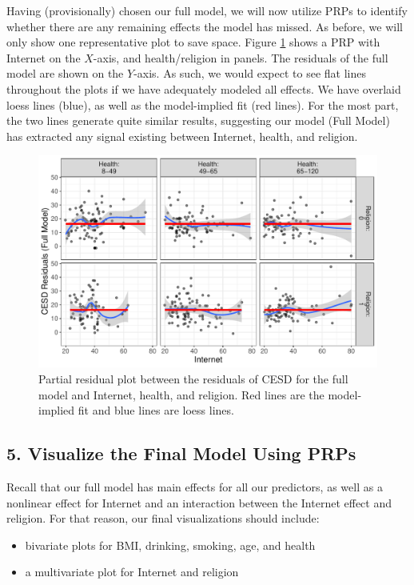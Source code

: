 \documentclass[
  man,floatsintext]{apa6}
\providecommand{\tightlist}{%
  \setlength{\itemsep}{0pt}\setlength{\parskip}{0pt}}
\begin{document}
Having (provisionally) chosen our full model, we will now utilize PRPs to identify whether there are any remaining effects the model has missed. As before, we will only show one representative plot to save space. Figure \ref{fig:prpexample} shows a PRP with Internet on the \(X\)-axis, and health/religion in panels. The residuals of the full model are shown on the \(Y\)-axis. As such, we would expect to see flat lines throughout the plots if we have adequately modeled all effects. We have overlaid loess lines (blue), as well as the model-implied fit (red lines). For the most part, the two lines generate quite similar results, suggesting our model (Full Model) has extracted any signal existing between Internet, health, and religion.

\begin{figure}

{\centering \includegraphics[width=0.75\linewidth]{visual_partitions_files/figure-latex/prpexample-1} 

}

\caption{Partial residual plot between the residuals of CESD for the full model and Internet, health, and religion. Red lines are the model-implied fit and blue lines are loess lines.}\label{fig:prpexample}
\end{figure}

\subsection{5. Visualize the Final Model Using PRPs}\label{visualize-the-final-model-using-prps-1}

Recall that our full model has main effects for all our predictors, as well as a nonlinear effect for Internet and an interaction between the Internet effect and religion. For that reason, our final visualizations should include:

\begin{itemize}
\tightlist
\item
  bivariate plots for BMI, drinking, smoking, age, and health
\item
  a multivariate plot for Internet and religion
\end{itemize}
\end{document}
